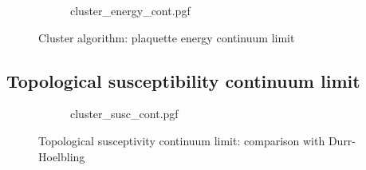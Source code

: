 \begin{figure}[!htb]
    \centering
    \begin{subfigure}{\textwidth}
        \centering
        {cluster_energy_cont.pgf}
    \end{subfigure}\vspace{2em}
    \begin{subfigure}{\textwidth}
        \centering
        
    \end{subfigure}
    \caption{Cluster algorithm: plaquette energy continuum limit}
    \label{fig:cluster_energy_cont}
\end{figure}

\subsection*{Topological susceptibility continuum limit}

\begin{figure}[!htb]
    \centering
    \begin{subfigure}{\textwidth}
        \centering
        {cluster_susc_cont.pgf}
    \end{subfigure}\vspace{2em}
    \begin{subfigure}{\textwidth}
        \centering
        
    \end{subfigure}
    \caption{Topological susceptivity continuum limit: comparison with Durr-Hoelbling}
    \label{fig:susc_cont}
\end{figure}


